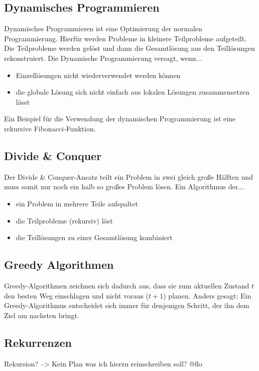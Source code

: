 \documentclass[12pt,a4paper]{article}
\begin{document}
\subsection{Dynamisches Programmieren}
Dynamisches Programmieren ist eine Optimierung der normalen Programmierung. Hierfür werden Probleme in kleinere Teilprobleme aufgeteilt. Die Teilprobleme werden gelöst und dann die Gesamtlösung aus den Teillösungen rekonstruiert.\newline
Die Dynamische Programmierung versagt, wenn...
\vspace{.35cm}
\begin{itemize}
	\item Einzellösungen nicht wiederverwendet werden können
	\item die globale Lösung sich nicht einfach aus lokalen Lösungen zusammensetzen lässt
\end{itemize}
\vspace{.35cm}
Ein Beispiel für die Verwendung der dynamischen Programmierung ist eine rekursive Fibonacci-Funktion.

\subsection{Divide \& Conquer}
Der Divide \& Conquer-Ansatz teilt ein Problem in zwei gleich große Hälften und muss somit nur noch ein halb so großes Problem lösen.\newline
Ein Algorithmus der...
\begin{itemize}
	\item ein Problem in mehrere Teile aufspaltet
	\item die Teilprobleme (rekursiv) löst
	\item die Teillösungen zu einer Gesamtlösung kombiniert
\end{itemize}

\subsection{Greedy Algorithmen}
Greedy-Algorithmen zeichnen sich dadurch aus, dass sie zum aktuellen Zustand $t$ den besten Weg einschlagen und nicht voraus ($t+1$) planen. Anders gesagt: Ein Greedy-Algorithmus entscheidet sich immer für denjenigen Schritt, der ihn dem Ziel am nachsten bringt.

\subsection{Rekurrenzen}
Rekursion? --> Kein Plan was ich hierzu reinschreiben soll? @flo
\end{document}
